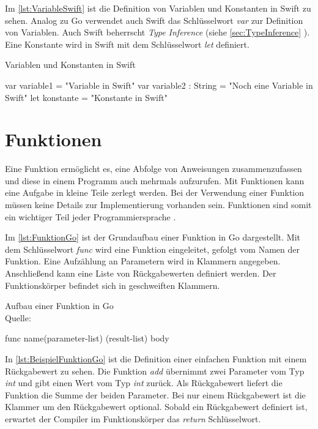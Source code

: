 Im \autoref{lst:VariableSwift} ist die Definition von Variablen und Konstanten in Swift zu sehen. 
Analog zu Go verwendet auch Swift das Schlüsselwort \emph{var} zur Definition von Variablen.
Auch Swift beherrscht \emph{Type Inference} (siehe \autoref{sec:TypeInference} ).
Eine Konstante wird in Swift mit dem Schlüsselwort \emph{let} definiert.

\begin{listing}[H]
\caption{Variablen und Konstanten in Swift}
\label{lst:VariableSwift}
\begin{SwiftCode}
var variable1 = "Variable in Swift"
var variable2 : String = "Noch eine Variable in Swift"
let konstante = "Konstante in Swift"
\end{SwiftCode}
\end{listing}

\section{Funktionen}
Eine Funktion ermöglicht es, eine Abfolge von Anweisungen zusammenzufassen und diese in einem Programm auch mehrmals aufzurufen. 
Mit Funktionen kann eine Aufgabe in kleine Teile zerlegt werden.
Bei der Verwendung einer Funktion müssen keine Details zur Implementierung vorhanden sein.
Funktionen sind somit ein wichtiger Teil jeder Programmiersprache \cite{Kennedy.2016}.

Im \autoref{lst:FunktionGo} ist der Grundaufbau einer Funktion in Go dargestellt.
Mit dem Schlüsselwort \emph{func} wird eine Funktion eingeleitet, gefolgt vom Namen der Funktion.
Eine Aufzählung an Parametern wird in Klammern angegeben. 
Anschließend kann eine Liste von Rückgabewerten definiert werden.
Der Funktionskörper befindet sich in geschweiften Klammern.

\begin{listing}[H]
\caption{Aufbau einer Funktion in Go \\ Quelle:\cite{Donovan.2016}}
\label{lst:FunktionGo}
\begin{GoCode}
func name(parameter-list) (result-list){
    body
}
\end{GoCode}
\end{listing}

In \autoref{lst:BeispielFunktionGo} ist die Definition einer einfachen Funktion mit einem Rückgabewert zu sehen. 
Die Funktion \emph{add} übernimmt zwei Parameter vom Typ \emph{int} und gibt einen Wert vom Typ \emph{int} zurück.
Als Rückgabewert liefert die Funktion die Summe der beiden Parameter.
Bei nur einem Rückgabewert ist die Klammer um den Rückgabewert optional.
Sobald ein Rückgabewert definiert ist, erwartet der Compiler im Funktionskörper das \emph{return} Schlüsselwort.

